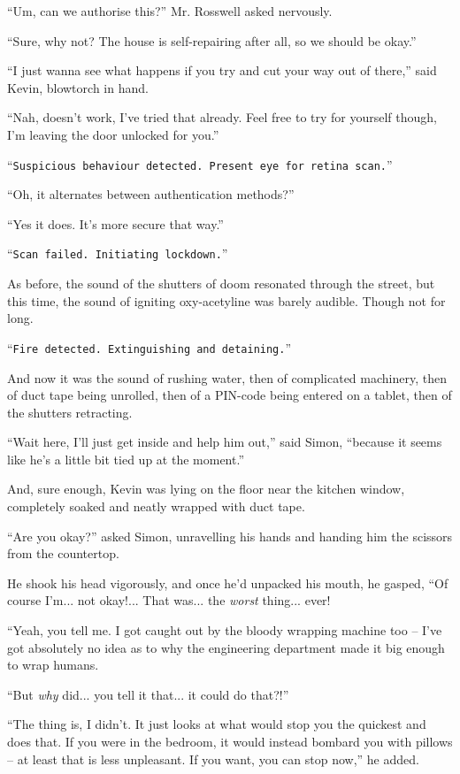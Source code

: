 \documentclass[10pt,a4paper]{article}
\newcommand{\lang}[2]{ #2 \par}
\newcommand{\ai}[2]{
	\lang{
		-- \texttt{#1}
	}{
		``\texttt{#2}''
	}
}
\newcommand{\mainname}{Simon}
\newcommand{\ceoname}{Mr. Rosswell}
\newcommand{\criminalname}{Kevin}
\begin{document}
\lang{-- Так, а мы можем это разрешить? -- нервно спросил \ceoname{}.}{``Um, can we authorise this?'' \ceoname{} asked nervously.}
\lang{-- Ну да, а почему бы и нет? Дом же умеет сам чиниться, так что всё должно быть в порядке.}{``Sure, why not? The house is self-repairing after all, so we should be okay.''}
\lang{-- Мне просто хочется посмотреть, что будет, если попробовать прорезать себе выход, -- сказал \criminalname{}, держа в руках резак.}{``I just wanna see what happens if you try and cut your way out of there,'' said \criminalname{}, blowtorch in hand.}
\lang{-- Не, так не прокатит, я уже пробовал. Но можешь попробовать сам, я вот тебе дверь оставил открытой.}{``Nah, doesn't work, I've tried that already. Feel free to try for yourself though, I'm leaving the door unlocked for you.''}
\ai{Замечено подозрительное поведение. Покажите глаз для сканирования сетчатки}{Suspicious behaviour detected. Present eye for retina scan.}
\lang{-- А, там несколько методов авторизации?}{``Oh, it alternates between authentication methods?''}
\lang{-- Ну да. Так безопаснее.}{``Yes it does. It's more secure that way.''}
\ai{Сканирование неуспешно. Активируется изоляция здания.}{Scan failed. Initiating lockdown.}
\lang{...}{As before, the sound of the shutters of doom resonated through the street, but this time, the sound of igniting oxy-acetyline was barely audible. Though not for long.}
\ai{...}{Fire detected. Extinguishing and detaining.}
\lang{...}{And now it was the sound of rushing water, then of complicated machinery, then of duct tape being unrolled, then of a PIN-code being entered on a tablet, then of the shutters retracting.}
\lang{...}{``Wait here, I'll just get inside and help him out,'' said \mainname{}, ``because it seems like he's a little bit tied up at the moment.''}
\lang{...}{And, sure enough, \criminalname{} was lying on the floor near the kitchen window, completely soaked and neatly wrapped with duct tape.}
\lang{...}{``Are you okay?'' asked \mainname{}, unravelling his hands and handing him the scissors from the countertop.}
\lang{...}{He shook his head vigorously, and once he'd unpacked his mouth, he gasped, ``Of course I'm... not okay!... That was... the \emph{worst} thing... ever!}
\lang{...}{``Yeah, you tell me. I got caught out by the bloody wrapping machine too -- I've got absolutely no idea as to why the engineering department made it big enough to wrap humans.}
\lang{...}{``But \emph{why} did... you tell it that... it could do that?!''}
\lang{...}{``The thing is, I didn't. It just looks at what would stop you the quickest and does that. If you were in the bedroom, it would instead bombard you with pillows -- at least that is less unpleasant. If you want, you can stop now,'' he added.}
\end{document}
